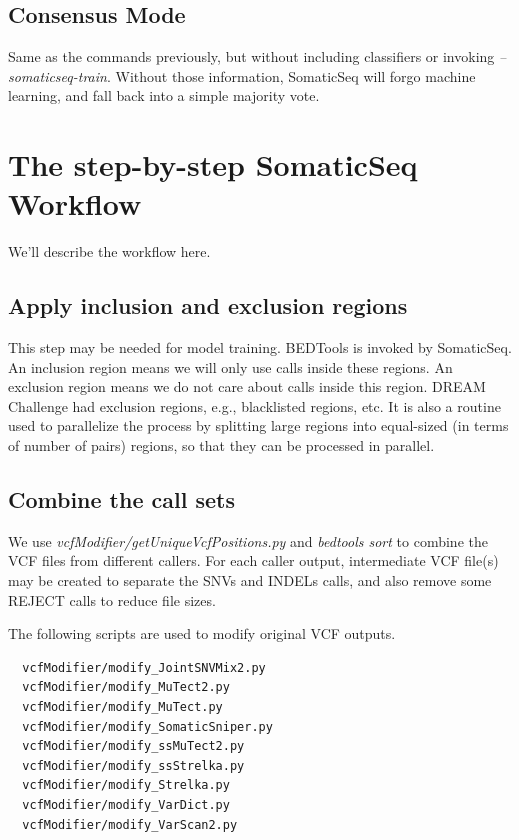 \documentclass[10pt,letterpaper]{article}
\begin{document}
\begin{sloppypar}
\subsection{Consensus Mode} \label{somaticseq_default_mode}

Same as the commands previously, but without including classifiers or invoking \textit{--somaticseq-train}. Without those information, SomaticSeq will forgo machine learning, and fall back into a simple majority vote.



\section{The step-by-step SomaticSeq Workflow} \label{step_by_step_procedures}

We'll describe the workflow here.

\subsection{Apply inclusion and exclusion regions}

This step may be needed for model training. BEDTools is invoked by SomaticSeq. An inclusion region means we will only use calls inside these regions. An exclusion region means we do not care about calls inside this region. DREAM Challenge had exclusion regions, e.g., blacklisted regions, etc. It is also a routine used to parallelize the process by splitting large regions into equal-sized (in terms of number of pairs) regions, so that they can be processed in parallel.  



\subsection{Combine the call sets}
We use \textit{vcfModifier/getUniqueVcfPositions.py} and \textit{bedtools sort} to combine the VCF files from different callers. For each caller output, intermediate VCF file(s) may be created to separate the SNVs and INDELs calls, and also remove some REJECT calls to reduce file sizes.

The following scripts are used to modify original VCF outputs.


\begin{lstlisting}
  vcfModifier/modify_JointSNVMix2.py
  vcfModifier/modify_MuTect2.py
  vcfModifier/modify_MuTect.py
  vcfModifier/modify_SomaticSniper.py
  vcfModifier/modify_ssMuTect2.py
  vcfModifier/modify_ssStrelka.py
  vcfModifier/modify_Strelka.py
  vcfModifier/modify_VarDict.py
  vcfModifier/modify_VarScan2.py
\end{lstlisting}


\end{sloppypar}
\end{document}
